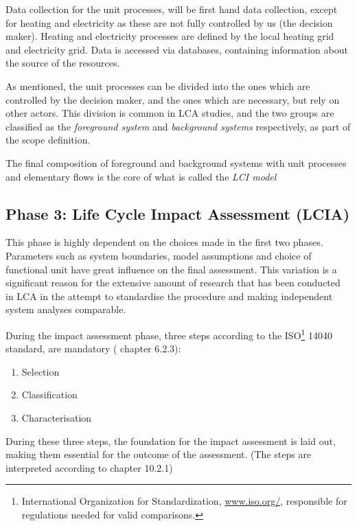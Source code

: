 Data collection for the unit processes, will be first hand data collection, except for heating and electricity as these are not fully controlled by us (the decision maker). Heating and electricity processes are defined by the local heating grid and electricity grid. Data is accessed via databases, containing information about the source of the resources. 

As mentioned, the unit processes can be divided into the ones which are controlled by the decision maker, and the ones which are necessary, but rely on other actors. This division is common in LCA studies, and the two groups are classified as the \emph{foreground system} and \emph{background systems} respectively, as part of the scope definition. 

The final composition of foreground and background systems with unit processes and elementary flows is the core of what is called the \emph{LCI model}

\subsection{Phase 3: Life Cycle Impact Assessment (LCIA)} \label{ssec:Phase3}

This phase is highly dependent on the choices made in the first two phases. Parameters such as system boundaries, model assumptions and choice of functional unit have great influence on the final assessment. This variation is a significant reason for the extensive amount of research that has been conducted in LCA in the attempt to standardise the procedure and making independent system analyses comparable. 

During the impact assessment phase, three steps according to the ISO\footnote{International Organization for Standardization, \url{www.iso.org/}, responsible for regulations needed for valid comparisons.} 14040 standard, are mandatory (\cite{LCA_TheoryAndPractice} chapter 6.2.3):
\begin{enumerate}
    \item Selection
    \item Classification
    \item Characterisation
\end{enumerate}

During these three steps, the foundation for the impact assessment is laid out, making them essential for the outcome of the assessment. (The steps are interpreted according to \cite{LCA_TheoryAndPractice} chapter 10.2.1)

